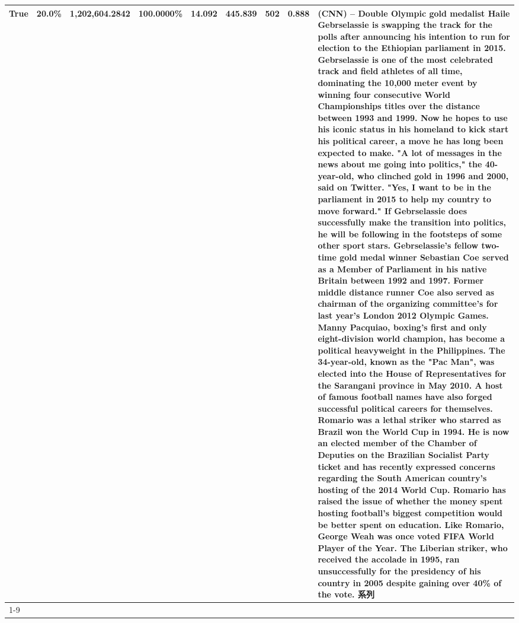 \begin{table}[H]
{\begin{tabular}{lllrlllll}
True & 20.0\% & 1,202,604.2842 & \bfseries \color{red} 100.0000\% & 14.092 & 445.839 & 502 & 0.888 & (CNN) -- Double Olympic gold medalist Haile Gebrselassie is swapping the track for the polls after announcing his intention to run for election to the Ethiopian parliament in 2015. Gebrselassie is one of the most celebrated track and field athletes of all time, dominating the 10,000 meter event by winning four consecutive World Championships titles over the distance between 1993 and 1999. Now he hopes to use his iconic status in his homeland to kick start his political career, a move he has long been expected to make. "A lot of messages in the news about me going into politics," the 40-year-old, who clinched gold in 1996 and 2000, said on Twitter. "Yes, I want to be in the parliament in 2015 to help my country to move forward." If Gebrselassie does successfully make the transition into politics, he will be following in the footsteps of some other sport stars. Gebrselassie's fellow two-time gold medal winner Sebastian Coe served as a Member of Parliament in his native Britain between 1992 and 1997. Former middle distance runner Coe also served as chairman of the organizing committee's for last year's London 2012 Olympic Games. Manny Pacquiao, boxing's first and only eight-division world champion, has become a political heavyweight in the Philippines. The 34-year-old, known as the "Pac Man", was elected into the House of Representatives for the Sarangani province in May 2010. A host of famous football names have also forged successful political careers for themselves. Romario was a lethal striker who starred as Brazil won the World Cup in 1994. He is now an elected member of the Chamber of Deputies on the Brazilian Socialist Party ticket and has recently expressed concerns regarding the South American country's hosting of the 2014 World Cup. Romario has raised the issue of whether the money spent hosting football's biggest competition would be better spent on education. Like Romario, George Weah was once voted FIFA World Player of the Year. The Liberian striker, who received the accolade in 1995, ran unsuccessfully for the presidency of his country in 2005 despite gaining over 40\% of the vote. 系列 \\
\cline{1-9}

\end{tabular}}
\end{table}
